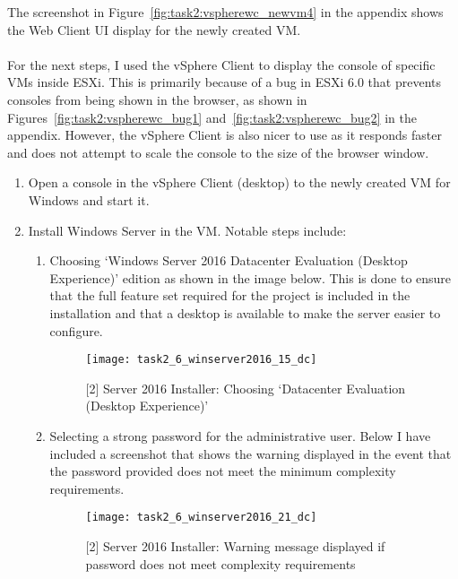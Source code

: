 \noindent The screenshot in Figure~\ref{fig:task2:vspherewc_newvm4} in the  appendix shows the Web Client UI display for the newly created VM.\\\\
\noindent For the next steps, I used the vSphere Client to display the console of specific VMs inside ESXi. This is primarily because of a bug in ESXi 6.0 that prevents consoles from being shown in the browser, as shown in Figures~\ref{fig:task2:vspherewc_bug1} and~\ref{fig:task2:vspherewc_bug2} in the  appendix. However, the vSphere Client is also nicer to use as it responds faster and does not attempt to scale the console to the size of the browser window.

\begin{enumerate}[resume*=task2methodology2]
  \item Open a console in the vSphere Client (desktop) to the newly created VM for Windows and start it.
  \item Install Windows Server in the VM. Notable steps include:
    \begin{enumerate}[label=(\alph*)]
      \item Choosing `Windows Server 2016 Datacenter Evaluation (Desktop Experience)' edition as shown in the image below. This is done to ensure that the full feature set required for the project is included in the installation and that a desktop is available to make the server easier to configure.
        \begin{figure}[H]
          \centering
          \captionsetup{skip=2pt}
          \texttt{[image: task2\_6\_winserver2016\_15\_dc]}
          \caption{[2] Server 2016 Installer: Choosing `Datacenter Evaluation (Desktop Experience)'}
          \label{fig:task2:vspherec_windc1}
        \end{figure}
      \item Selecting a strong password for the administrative user. Below I have included a screenshot that shows the warning displayed in the event that the password provided does not meet the minimum complexity requirements.
        \begin{figure}[H]
          \centering
          \captionsetup{skip=2pt}
          \texttt{[image: task2\_6\_winserver2016\_21\_dc]}
          \caption{[2] Server 2016 Installer: Warning message displayed if password does not meet complexity requirements}
          \label{fig:task2:vspherec_windc2}
        \end{figure}
    \end{enumerate}
\end{enumerate}


